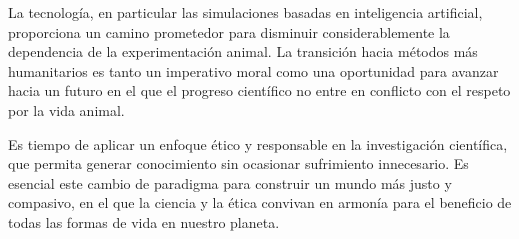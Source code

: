 \documentclass[letterpaper, 12pt]{report}
\begin{document}
La tecnología, en particular las simulaciones basadas en inteligencia 
artificial, proporciona un camino prometedor para disminuir 
considerablemente la dependencia de la experimentación animal. La transición 
hacia métodos más humanitarios es tanto un imperativo moral como una 
oportunidad para avanzar hacia un futuro en el que el progreso científico
no entre en conflicto con el respeto por la vida animal.

Es tiempo de aplicar un enfoque ético y responsable en la investigación 
científica, que permita generar conocimiento sin ocasionar sufrimiento 
innecesario. Es esencial este cambio de paradigma para construir un mundo 
más justo y compasivo, en el que la ciencia y la ética convivan en armonía 
para el beneficio de todas las formas de vida en nuestro planeta.

\printbibliography
\end{document}
